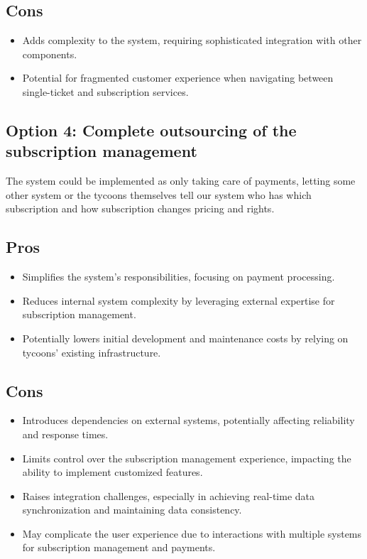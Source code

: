 \subsection*{Cons}
\begin{itemize}[noitemsep]
    \item Adds complexity to the system, requiring sophisticated integration with other components.
    \item Potential for fragmented customer experience when navigating between single-ticket and subscription services.
\end{itemize}

\subsection*{Option 4: Complete outsourcing of the subscription management}
The system could be implemented as only taking care of payments, letting some other system or the tycoons themselves tell our system who has which subscription and how subscription changes pricing and rights.

\subsection*{Pros}
\begin{itemize}[noitemsep]
    \item Simplifies the system's responsibilities, focusing on payment processing.
    \item Reduces internal system complexity by leveraging external expertise for subscription management.
    \item Potentially lowers initial development and maintenance costs by relying on tycoons' existing infrastructure.
\end{itemize}

\subsection*{Cons}
\begin{itemize}[noitemsep]
    \item Introduces dependencies on external systems, potentially affecting reliability and response times.
    \item Limits control over the subscription management experience, impacting the ability to implement customized features.
    \item Raises integration challenges, especially in achieving real-time data synchronization and maintaining data consistency.
    \item May complicate the user experience due to interactions with multiple systems for subscription management and payments.
\end{itemize}

